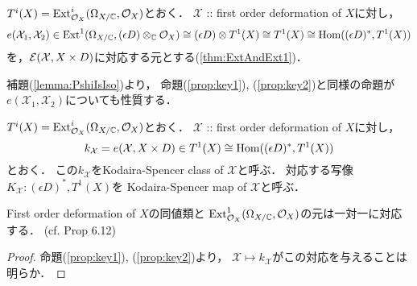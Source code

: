 \documentclass[a4paper]{jsarticle}
\newcommand{\famX}{\mathcal{X}}
\begin{document}
    \subsection{\tp{$e(\famX_1, \famX_2)$}{e(X1,X2)}}
    \begin{Def}
        $T^i(X)=\operatorname{Ext}^i_{\mathcal{O}_X}(\Omega_{X/\mathbb{C}}, \mathcal{O}_X)$とおく．
        $\famX$ :: first order deformation of $X$に対し，
        \[
            e(\famX_1, \famX_2)
                \in
                \Ext^1(\shDer_{X/\C}, (\epsilon D) \otimes_{\C} \shO_X)
                \iso (\epsilon D) \otimes T^1(X)
                \iso T^1(X)
                \iso \Hom((\epsilon D)^*, T^1(X))
        \]
        を，$\shE(\famX, X \times D)$に対応する元とする(\ref{thm:ExtAndExt1})．
    \end{Def}
    補題(\ref{lemma:PshiIsIso})より，
    命題(\ref{prop:key1}), (\ref{prop:key2})と同様の命題が
    $e(\famX_1, \famX_2)$についても性質する．

    \begin{Def}\label{def:KSclass-map}
        $T^i(X)=\operatorname{Ext}^i_{\mathcal{O}_X}(\Omega_{X/\mathbb{C}}, \mathcal{O}_X)$とおく．
        $\famX$ :: first order deformation of $X$に対し，
        \[
            k_{\famX}=e(\famX, X \times D)
                \in T^1(X) \iso \Hom((\epsilon D)^*, T^1(X))
        \]
        とおく．
        この$k_{\famX}$をKodaira-Spencer class of $\famX$と呼ぶ．
        対応する写像$K_{\famX}: (\epsilon D)^*, T^1(X)$を
        Kodaira-Spencer map of $\famX$と呼ぶ．
    \end{Def}
    
    \begin{Thm}\label{thm:SpaceOf1stOrdDefOfLCI}
        First order deformation of $X$の同値類と
        $\operatorname{Ext}^1_{\mathcal{O}_X}(\Omega_{X/\mathbb{C}}, \mathcal{O}_X)$の元は一対一に対応する．
        (cf. \cite{DefLCI} Prop 6.12)
    \end{Thm}
    \begin{proof}
        命題(\ref{prop:key1}), (\ref{prop:key2})より，
        $\famX \mapsto k_{\famX}$がこの対応を与えることは明らか．
    \end{proof}



\end{document}
